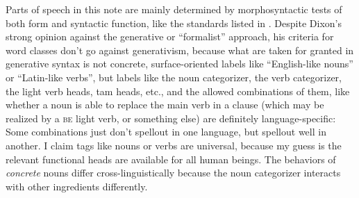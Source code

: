 \documentclass[UTF8, a4paper, oneside, scheme=plain]{ctexrep}
\newcommand*{\citesec}[1]{\S~{#1}}
\newcommand{\category}[1]{\textsc{#1}}
\begin{document}
Parts of speech in this note are mainly determined 
by morphosyntactic tests of both form and syntactic function,
like the standards listed in \citet[\citesec{3.3}]{dixon2009basic1}.
Despite Dixon's strong opinion against the generative or ``formalist'' approach,
his criteria for word classes don't go against generativism,
because what are taken for granted in generative syntax 
is not concrete, surface-oriented labels like ``English-like nouns'' or ``Latin-like verbs'', 
but labels like the noun categorizer, the verb categorizer,
the light verb heads, \acs{tam} heads, etc.,
and the allowed combinations of them, 
like whether a noun is able to replace the main verb in a clause 
(which may be realized by a \category{be} light verb, or something else)
are definitely language-specific:
Some combinations just don't spellout in one language,
but spellout well in another.
I claim tags like nouns or verbs are universal,
because my guess is the relevant functional heads are available for all human beings.
The behaviors of \emph{concrete} nouns differ cross-linguistically
because the noun categorizer interacts with other ingredients differently.%
\end{document}
